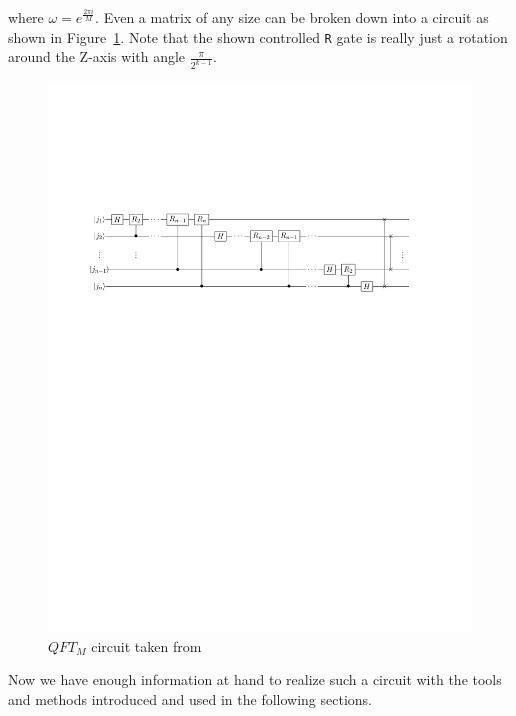 where \(\omega = e^{\frac{2\pi i}{M}}\).
Even a matrix of any size can be broken down into a circuit as shown in Figure~\ref{fig:qft-generic-circuit}.
Note that the shown controlled \texttt{R} gate is really just a rotation around the Z-axis with angle \(\frac{\pi}{2^{k-1}}\).

\begin{figure}[H]
    \centering
    \includegraphics[width=\textwidth]{res/qftm_circuit.pdf}
    \caption{\(QFT_M\) circuit taken from \protect{}}
    \label{fig:qft-generic-circuit}
\end{figure}

Now we have enough information at hand to realize such a circuit with the tools and methods introduced and used in the following sections.
